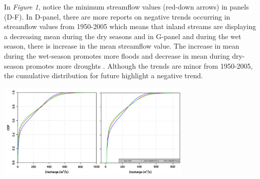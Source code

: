 \documentclass[a4paper,man,biblatex]{apa6}
\begin{document}
\par In \textit{Figure 1}, notice the minimum streamflow values (red-down arrows) in panels (D-F). In D-panel, there are more reports on negative trends occurring in streamflow values from 1950-2005 which means that inland streams are displaying a decreasing mean during the dry seasons and in G-panel and during the wet season, there is increase in the mean streamflow value. The increase in mean during the wet-season promotes more floods and decrease in mean during dry-season promotes more droughts \autocite{mallakpour_2018}. Although the trends are minor from 1950-2005, the cumulative distribution for future highlight a negative trend.\\

\begin{center}
    \includegraphics[width=0.7\textwidth]{cdf_streamflow}
    \label{fig:cdf}
\end{center}
\medskip
\end{document}
